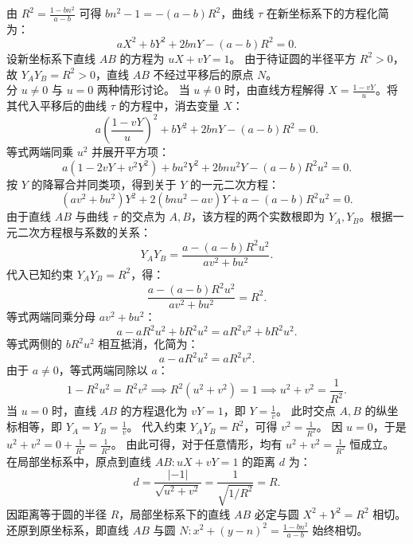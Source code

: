 \begin{solution}
由 $R^2 = \frac{1 - bn^2}{a - b}$ 可得 $bn^2 - 1 = -(a - b)R^2$，曲线 $\tau$ 在新坐标系下的方程化简为：
\[ aX^2 + bY^2 + 2bnY - (a - b)R^2 = 0. \]
设新坐标系下直线 $AB$ 的方程为 $uX + vY = 1$。
由于待证圆的半径平方 $R^2 > 0$，故 $Y_A Y_B = R^2 > 0$，直线 $AB$ 不经过平移后的原点 $N$。\\
分 $u \neq 0$ 与 $u = 0$ 两种情形讨论。
当 $u \neq 0$ 时，由直线方程解得 $X = \frac{1 - vY}{u}$。将其代入平移后的曲线 $\tau$ 的方程中，消去变量 $X$：
\[ a \left( \frac{1 - vY}{u} \right)^2 + bY^2 + 2bnY - (a - b)R^2 = 0. \]
等式两端同乘 $u^2$ 并展开平方项：
\[ a(1 - 2vY + v^2 Y^2) + bu^2 Y^2 + 2bnu^2 Y - (a - b)R^2 u^2 = 0. \]
按 $Y$ 的降幂合并同类项，得到关于 $Y$ 的一元二次方程：
\[ (av^2 + bu^2)Y^2 + 2(bnu^2 - av)Y + a - (a - b)R^2 u^2 = 0. \]
由于直线 $AB$ 与曲线 $\tau$ 的交点为 $A, B$，该方程的两个实数根即为 $Y_A, Y_B$。根据一元二次方程根与系数的关系：
\[ Y_A Y_B = \frac{a - (a - b)R^2 u^2}{av^2 + bu^2}. \]
代入已知约束 $Y_A Y_B = R^2$，得：
\[ \frac{a - (a - b)R^2 u^2}{av^2 + bu^2} = R^2. \]
等式两端同乘分母 $av^2 + bu^2$：
\[ a - aR^2 u^2 + bR^2 u^2 = aR^2 v^2 + bR^2 u^2. \]
等式两侧的 $bR^2 u^2$ 相互抵消，化简为：
\[ a - aR^2 u^2 = aR^2 v^2. \]
由于 $a \neq 0$，等式两端同除以 $a$：
\[ 1 - R^2 u^2 = R^2 v^2 \implies R^2(u^2 + v^2) = 1 \implies u^2 + v^2 = \frac{1}{R^2}. \]
当 $u = 0$ 时，直线 $AB$ 的方程退化为 $vY = 1$，即 $Y = \frac{1}{v}$。
此时交点 $A, B$ 的纵坐标相等，即 $Y_A = Y_B = \frac{1}{v}$。
代入约束 $Y_A Y_B = R^2$，可得 $v^2 = \frac{1}{R^2}$。
因 $u = 0$，于是 $u^2 + v^2 = 0 + \frac{1}{R^2} = \frac{1}{R^2}$。
由此可得，对于任意情形，均有 $u^2 + v^2 = \frac{1}{R^2}$ 恒成立。
在局部坐标系中，原点到直线 $AB: uX + vY = 1$ 的距离 $d$ 为：
\[ d = \frac{|-1|}{\sqrt{u^2 + v^2}} = \frac{1}{\sqrt{1/R^2}} = R. \]
因距离等于圆的半径 $R$，局部坐标系下的直线 $AB$ 必定与圆 $X^2 + Y^2 = R^2$ 相切。
还原到原坐标系，即直线 $AB$ 与圆 $N: x^2 + (y - n)^2 = \frac{1 - bn^2}{a - b}$ 始终相切。
\end{solution}


